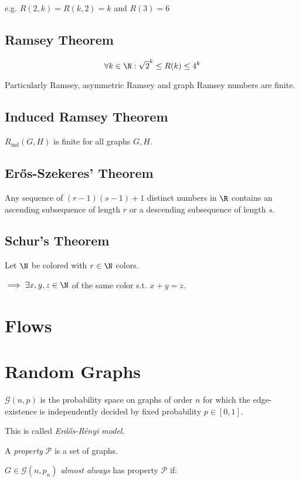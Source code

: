 e.g. $R(2,k) = R(k,2) = k$ and $R(3) = 6$

\subsection*{Ramsey Theorem}

$$\forall k \in \N : \sqrt{2}^k \leq R(k) \leq 4^k$$

Particularly Ramsey, asymmetric Ramsey and graph Ramsey numbers are finite.

\subsection*{Induced Ramsey Theorem}

$R_\text{ind}(G,H)$ is finite for all graphs $G, H$.

\subsection*{Er\H{o}s-Szekeres' Theorem}

Any sequence of $(r-1)(s-1)+1$ distinct numbers in $\R$ contains an ascending subsequence of length $r$ or a descending subsequence of length $s$.

\subsection*{Schur's Theorem}

Let $\N$ be colored with $r \in \N$ colors.

$\implies \exists x, y, z \in \N$ of the same color s.t. $x+y=z$.

\section*{Flows}

\section*{Random Graphs}

$\mathcal{G}(n,p)$ is the probability space on graphs of order $n$ for which the edge-existence is independently decided by fixed probability $p \in [0,1]$.

This is called \emph{Erd\H{o}s-R\'{e}nyi model}.

\spacing

A \emph{property} $\mathcal{P}$ is a set of graphs.

$G \in \mathcal{G}(n,p_n)$ \emph{almost always} has property $\mathcal{P}$ if:


